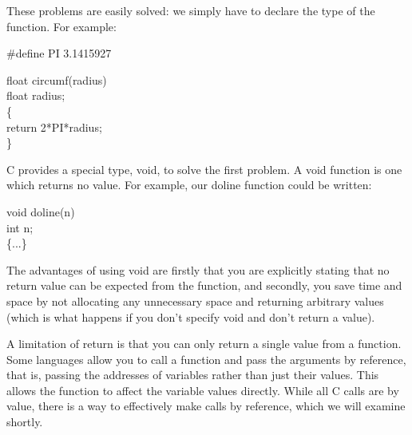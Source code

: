      These problems are easily solved: we simply have to declare
the type of the function. For example:
\begin{code}          
 \#define   PI   3.1415927 \addVspace

 float circumf(radius) \\
 \> float radius; \\
 \{ \\
 \>   return 2*PI*radius; \\
 \}
\end{code}
\noindent
     C provides  a special  type, {\cd void},  to solve  the first  
problem. A  {\cd void} function is one which returns no value. For
example, our {\cd doline} function could be written:
\begin{code}
 void doline(n) \\
 \> int n; \\
 \{...\}
\end{code}
\noindent
     The advantages  of using {\cd void} are firstly that you are
explicitly stating that no  return value can be expected from the
function, and secondly, you save time and  space by  not allocating 
any unnecessary space and returning arbitrary values (which  is
what  happens if  you don't  specify {\cd void} and don't return a
value).

     A limitation  of {\cd return} is that you can only return a
single value from a function. Some  languages allow  you to call a
function and pass the arguments 
{\kc by reference},  that is, passing
the addresses of variables rather than just their values. This
allows the function to affect the variable values directly.  While
all  C calls  are  by  value, there is a way to effectively make
calls by reference, which we will examine shortly.

